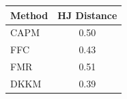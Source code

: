 \begin{tabular}{l c}
\toprule
Method & HJ Distance \\
\midrule
CAPM & 0.50 \\
FFC & 0.43 \\
FMR & 0.51 \\
DKKM & 0.39 \\
\bottomrule
\end{tabular}